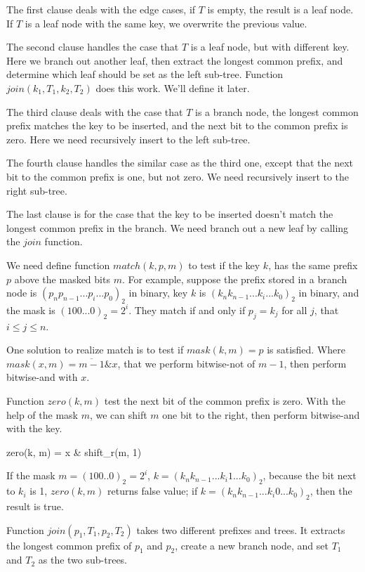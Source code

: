 \documentclass{article}
\begin{document}
The first clause deals with the edge cases, if $T$ is empty, the result is a leaf
node. If $T$ is a leaf node with the same key, we overwrite the previous
value.

The second clause handles the case that $T$ is a leaf node, but with different
key. Here we branch out another leaf, then extract the longest
common prefix, and determine which leaf should be set as the left sub-tree.
Function $join(k_1, T_1, k_2, T_2)$ does this work. We'll define it later.

The third clause deals with the case that $T$ is a branch node, the
longest common prefix matches the key to be inserted, and the next
bit to the common prefix is zero. Here we need recursively insert
to the left sub-tree.

The fourth clause handles the similar case as the third one, except
that the next bit to the common prefix is one, but not zero. We need
recursively insert to the right sub-tree.

The last clause is for the case that the key to be inserted doesn't
match the longest common prefix in the branch. We need branch
out a new leaf by calling the $join$ function.

We need define function $match(k, p, m)$ to test if the key $k$, has
the same prefix $p$ above the masked bits $m$.
For example, suppose the prefix stored in a branch node is
$(p_np_{n-1} ... p_i...p_0)_2$ in binary, key $k$ is
$(k_nk_{n-1} ... k_i ... k_0)_2$ in binary, and the mask is
$(100...0)_2=2^i$. They match if and only if $p_j=k_j$ for all $j$, that $i \leq j \leq n$.

One solution to realize match is to test if $mask(k, m) = p$ is satisfied.
Where $mask(x, m) = \overline{m-1} \& x$, that we perform bitwise-not of $m-1$, then
perform bitwise-and with $x$.

Function $zero(k, m)$ test the next bit of the common prefix is zero.
With the help of the mask $m$, we can shift $m$ one bit to the right,
then perform bitwise-and with the key.

\be
zero(k, m) = x \& shift_r(m, 1)
\ee

If the mask $m = (100..0)_2 = 2^i$, $k = (k_nk_{n-1}...k_i1...k_0)_2$,
because the bit next to $k_i$ is 1, $zero(k, m)$ returns false value;
if $k = (k_nk_{n-1}...k_i0...k_0)_2$, then the result is true.

Function $join(p_1, T_1, p_2, T_2)$ takes two different prefixes and trees.
It extracts the longest common prefix of $p_1$ and $p_2$, create a
new branch node, and set $T_1$ and $T_2$ as the two sub-trees.
\end{document}
